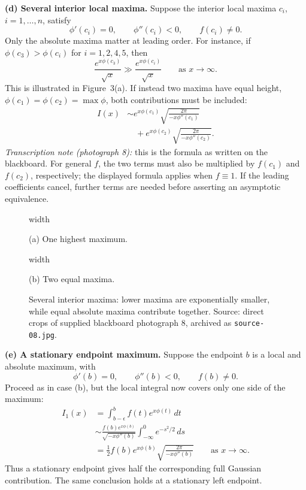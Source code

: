 \documentclass[11pt,a4paper]{article}
\begin{document}
\medskip
\noindent\textbf{(d) Several interior local maxima.}
Suppose the interior local maxima $c_i$, $i=1,\ldots,n$, satisfy
\[
    \phi'(c_i)=0,\qquad\phi''(c_i)<0,\qquad f(c_i)\neq0.
\]
Only the absolute maxima matter at leading order. For instance, if
$\phi(c_3)>\phi(c_i)$ for $i=1,2,4,5$, then
\[
    \frac{e^{x\phi(c_3)}}{\sqrt{x}}
    \gg\frac{e^{x\phi(c_i)}}{\sqrt{x}}
    \qquad\text{as }x\to\infty.
\]
This is illustrated in Figure~3(a).
If instead two maxima have equal height,
$\phi(c_1)=\phi(c_2)=\max\phi$, both contributions must be included:
\begin{align*}
    I(x)&\sim e^{x\phi(c_1)}
    \sqrt{\frac{2\pi}{-x\phi''(c_1)}}\\
    &\quad+e^{x\phi(c_2)}
    \sqrt{\frac{2\pi}{-x\phi''(c_2)}}.
\end{align*}
\emph{Transcription note (photograph 8):} this is the formula as written
on the blackboard. For general $f$, the two terms must also be multiplied
by $f(c_1)$ and $f(c_2)$, respectively; the displayed formula applies when
$f\equiv1$. If the leading coefficients cancel, further terms are needed
before asserting an asymptotic equivalence.
\begin{figure}[htbp]
    \centering
    \begin{minipage}[t]{0.48\linewidth}
        \centering
        \pdfximage width \linewidth {figures/asymptotic-lecture6/unequal-maxima.jpg}
        \pdfrefximage\pdflastximage
        \par\smallskip (a) One highest maximum.
    \end{minipage}\hfill
    \begin{minipage}[t]{0.48\linewidth}
        \centering
        \pdfximage width \linewidth {figures/asymptotic-lecture6/equal-maxima.jpg}
        \pdfrefximage\pdflastximage
        \par\smallskip (b) Two equal maxima.
    \end{minipage}
    \caption{Several interior maxima: lower maxima are exponentially
    smaller, while equal absolute maxima contribute together. Source:
    direct crops of supplied blackboard photograph 8, archived as
    \texttt{source-08.jpg}.}
    \label{fig:am-lecture6-multiple-maxima}
\end{figure}

\medskip
\noindent\textbf{(e) A stationary endpoint maximum.}
Suppose the endpoint $b$ is a local and absolute maximum, with
\[
    \phi'(b)=0,\qquad\phi''(b)<0,\qquad f(b)\neq0.
\]
Proceed as in case (b), but the local integral now covers only one side
of the maximum:
\begin{align*}
    I_1(x)&=\int_{b-\epsilon}^{b}f(t)e^{x\phi(t)}\,dt\\
    &\sim\frac{f(b)e^{x\phi(b)}}{\sqrt{-x\phi''(b)}}
    \int_{-\infty}^0 e^{-s^2/2}\,ds\\
    &=\frac12 f(b)e^{x\phi(b)}
    \sqrt{\frac{2\pi}{-x\phi''(b)}}
    \qquad\text{as }x\to\infty.
\end{align*}
Thus a stationary endpoint gives half the corresponding full Gaussian
contribution. The same conclusion holds at a stationary left endpoint.
\end{document}
